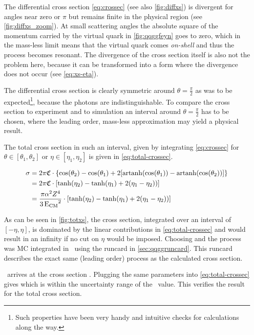 The differential cross section \cref{eq:crossec} (see also
\cref{fig:diffxs}) is divergent for angles near zero or \(\pi\) but
remains finite in the physical region (see \cref{fig:diffxs_zoom}). At
small scattering angles the absolute square of the momentum carried by
the virtual quark in \cref{fig:qqggfeyn} goes to zero, which in the
mass-less limit means that the virtual quark comes \emph{on-shell} and
thus the process becomes resonant. The divergence of the cross section
itself is also not the problem here, because it can be transformed
into a form where the divergence does not occur (see
\cref{eq:xs-eta}).

The differential cross section is clearly symmetric around
\(\theta=\frac{\pi}{2}\) as was to be expected\footnote{Such
  properties have been very handy and intuitive checks for
  calculations along the way.}, because the photons are
indistinguishable. To compare the cross section to experiment and to
simulation an interval around \(\theta=\frac{\pi}{2}\) has to be
chosen, where the leading order, mass-less approximation may yield a
physical result.

The total cross section in such an interval, given by
integrating \cref{eq:crossec} for \(\theta\in [\theta_1, \theta_2]\)
or \(\eta\in [\eta_1, \eta_2]\) is given
in \cref{eq:total-crossec}.

\begin{equation}
  \label{eq:total-crossec}
  \begin{split}
  \sigma &=
  2\pi\mathfrak{C}\cdot\qty{\cos(\theta_2)-\cos(\theta_1)+2\qty[\operatorname{artanh}(\cos(\theta_1))
    - \operatorname{artanh}(\cos(\theta_2))]} \\
  &=2\pi\mathfrak{C}\cdot\qty[\tanh(\eta_2) - \tanh(\eta_1) + 2(\eta_1
  - \eta_2))] \\
  &={\frac{\pi\alpha^2Z^4}{3\operatorname{E_{\text{CM}}}^2}}\cdot\qty[\tanh(\eta_2) - \tanh(\eta_1) + 2(\eta_1
  - \eta_2))]
  \end{split}
\end{equation}

As can be seen in \cref{fig:totxs}, the cross section, integrated over
an interval of \([-\eta, \eta]\), is dominated by the linear
contributions in \cref{eq:total-crossec} and would result in an
infinity if no cut on \(\eta\) would be imposed. Choosing
 and  the
process was MC integrated in \sherpa\ using the runcard in
\cref{sec:qqggruncard}. This runcard describes the exact same (leading
order) process as the calculated cross section.

\sherpa\ arrives at the cross section
. Plugging the same parameters into
\cref{eq:total-crossec} gives  which is within
the uncertainty range of the \sherpa\ value. This verifies the result
for the total cross section.

